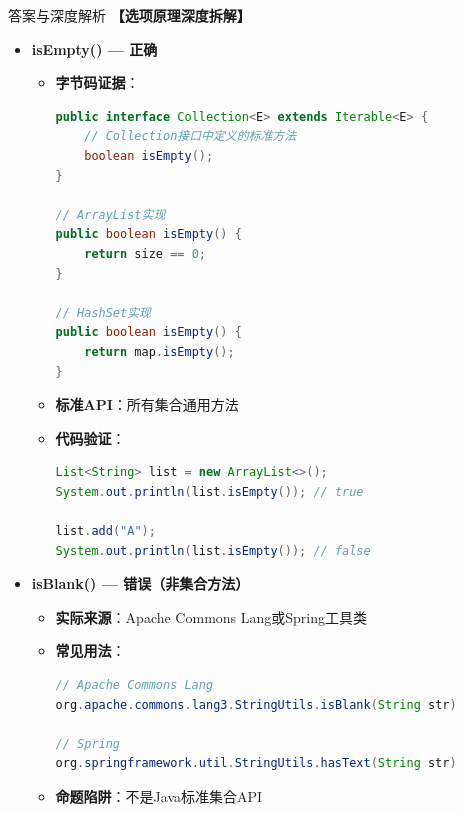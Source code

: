 \documentclass[12pt, a4paper]{ctexart}
\begin{document}
\begin{enumerate}[label=\textbf{\arabic*.}]
\begin{bluebox}{答案与深度解析}
		      \textbf{【选项原理深度拆解】}

		      \begin{itemize}[leftmargin=*, nosep, label={}]
			      \item[A] \textbf{isEmpty() — 正确}
			            \begin{itemize}[label={}, leftmargin=*, nosep]
				            \item \textbf{字节码证据}：
				                  \begin{lstlisting}[language=Java]
public interface Collection<E> extends Iterable<E> {
    // Collection接口中定义的标准方法
    boolean isEmpty();
}

// ArrayList实现
public boolean isEmpty() {
    return size == 0;
}

// HashSet实现
public boolean isEmpty() {
    return map.isEmpty();
}
				      \end{lstlisting}
				            \item \textbf{标准API}：所有集合通用方法
				            \item \textbf{代码验证}：
				                  \begin{lstlisting}[language=Java]
List<String> list = new ArrayList<>();
System.out.println(list.isEmpty()); // true

list.add("A");
System.out.println(list.isEmpty()); // false
				      \end{lstlisting}
			            \end{itemize}

			      \item[B] \textbf{isBlank() — 错误（非集合方法）}
			            \begin{itemize}[label={}, leftmargin=*, nosep]
				            \item \textbf{实际来源}：Apache Commons Lang或Spring工具类
				            \item \textbf{常见用法}：
				                  \begin{lstlisting}[language=Java]
// Apache Commons Lang
org.apache.commons.lang3.StringUtils.isBlank(String str)

// Spring
org.springframework.util.StringUtils.hasText(String str)
				      \end{lstlisting}
				            \item \textbf{命题陷阱}：不是Java标准集合API
			            \end{itemize}


\end{itemize}
\end{bluebox}
\end{enumerate}
\end{document}
